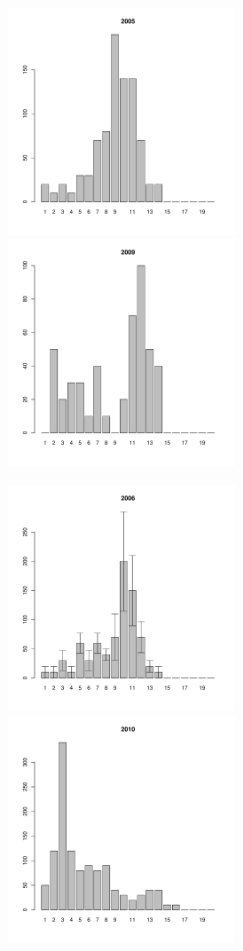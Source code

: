 \begin{figure}[h]
\begin{multicols}{3}
\hfill
\includegraphics[width=60mm]{../White_Sea/Luvenga_Goreliy/low_2005_.pdf}
\hfill
\includegraphics[width=60mm]{../White_Sea/Luvenga_Goreliy/low_2009_.pdf}
\end{multicols}


\begin{multicols}{3}
\hfill
\includegraphics[width=60mm]{../White_Sea/Luvenga_Goreliy/low_2006_.pdf}
\hfill
\includegraphics[width=60mm]{../White_Sea/Luvenga_Goreliy/low_2010_.pdf}
\end{multicols}


\end{figure}
